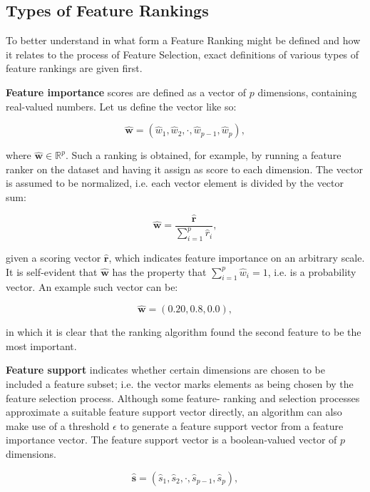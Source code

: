 \documentclass{article}
\begin{document}
\subsection{Types of Feature Rankings}\label{section:types of feature rankings}
To better understand in what form a Feature Ranking might be defined and how it relates to the process of Feature Selection, exact definitions of various types of feature rankings are given first.

\textbf{Feature importance} scores are defined as a vector of $p$ dimensions, containing real-valued numbers. Let us define the vector like so:

\begin{equation}
\hat{\boldsymbol{w}} = (\hat{w}_1, \hat{w}_2, \cdot, \hat{w}_{p-1}, \hat{w}_p),
\end{equation}

where $\hat{\boldsymbol{w}} \in \mathbb{R}^p$. Such a ranking is obtained, for example, by running a feature ranker on the dataset and having it assign as score to each dimension. The vector is assumed to be normalized, i.e. each vector element is divided by the vector sum:

\begin{equation}\label{eq:normalize-feature-ranking}
\hat{\boldsymbol{w}} = \frac{\hat{\boldsymbol{r}}}{\sum^p_{i=1} \hat{r}_i},
\end{equation}

given a scoring vector $\hat{\boldsymbol{r}}$, which indicates feature importance on an arbitrary scale. It is self-evident that $\hat{\boldsymbol{w}}$ has the property that $\sum^p_{i=1} \hat{w}_i = 1$, i.e. is a probability vector. An example such vector can be:

$$\hat{\boldsymbol{w}} = (0.20, 0.8, 0.0),$$

in which it is clear that the ranking algorithm found the second feature to be the most important.

\textbf{Feature support} indicates whether certain dimensions are chosen to be included a feature subset; i.e. the vector marks elements as being chosen by the feature selection process. Although some feature- ranking and selection processes approximate a suitable feature support vector directly, an algorithm can also make use of a threshold $\epsilon$ to generate a feature support vector from a feature importance vector. The feature support vector is a boolean-valued vector of $p$ dimensions.

\begin{equation}
\hat{\boldsymbol{s}} = (\hat{s}_1, \hat{s}_2, \cdot, \hat{s}_{p-1}, \hat{s}_p),
\end{equation}
\end{document}
